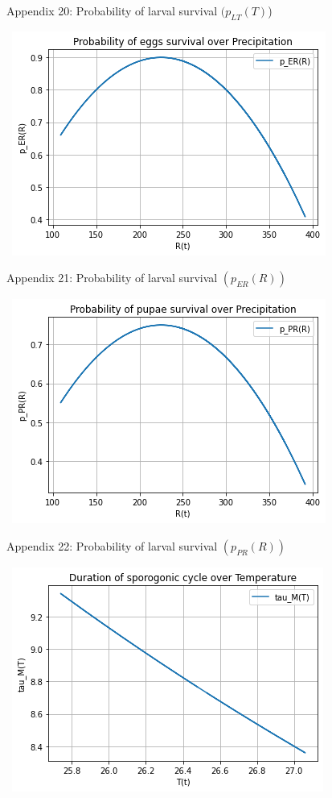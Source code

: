 \documentclass[
	12pt,				%
	oneside,			%
	a4paper,			%
	english,			%
	brazil				%
	]{abntex2}
\begin{document}
\begin{apendicesenv}
\begin{figure}[!ht]
	\caption*{Appendix 20: Probability of larval survival $(p_{LT}(T)$)}
\end{figure}
\newpage
\begin{figure}[!ht]
	\centering
	\hbox{\hspace{4.0em} \includegraphics[scale=0.8] {THESIS-Plot_p_ER(R).png}}
	\caption*{Appendix 21: Probability of larval survival $(p_{ER}(R))$}
\end{figure} 
\begin{figure}[!ht]
	\centering
	\hbox{\hspace{4.0em} \includegraphics[scale=0.8] {THESIS-Plot_p_PR(R).png}}
	\caption*{Appendix 22: Probability of larval survival $(p_{PR}(R))$}
\end{figure}
\newpage
\begin{figure}[!ht]
	\centering
	\hbox{\hspace{4.0em} \includegraphics[scale=0.8] {THESIS-Plot_tau_M(T).png}}

\end{figure}
\end{apendicesenv}
\end{document}

